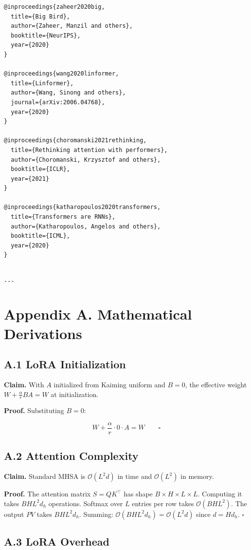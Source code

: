 \begin{lstlisting}
@inproceedings{zaheer2020big,
  title={Big Bird},
  author={Zaheer, Manzil and others},
  booktitle={NeurIPS},
  year={2020}
}

@inproceedings{wang2020linformer,
  title={Linformer},
  author={Wang, Sinong and others},
  journal={arXiv:2006.04768},
  year={2020}
}

@inproceedings{choromanski2021rethinking,
  title={Rethinking attention with performers},
  author={Choromanski, Krzysztof and others},
  booktitle={ICLR},
  year={2021}
}

@inproceedings{katharopoulos2020transformers,
  title={Transformers are RNNs},
  author={Katharopoulos, Angelos and others},
  booktitle={ICML},
  year={2020}
}
\end{lstlisting}
\begin{lstlisting}

---
\end{lstlisting}


\section{Appendix A. Mathematical Derivations}

\subsection{A.1 LoRA Initialization}

\textbf{Claim.} With $A$ initialized from Kaiming uniform and $B = 0$, the 
effective weight $W + \frac{\alpha}{r} B A = W$ at initialization.

\textbf{Proof.} Substituting $B = 0$:

\[
W + \frac{\alpha}{r} \cdot 0 \cdot A = W \qquad \square
\]

\subsection{A.2 Attention Complexity}

\textbf{Claim.} Standard MHSA is $\mathcal{O}(L^2 d)$ in time and $\mathcal{O}(L^2)$ 
in memory.

\textbf{Proof.} The attention matrix $S = Q K^\top$ has shape $B \times H \times L \times L$. 
Computing it takes $B H L^2 d_h$ operations. Softmax over $L$ entries per 
row takes $\mathcal{O}(B H L^2)$. The output $P V$ takes $B H L^2 d_h$. 
Summing: $\mathcal{O}(B H L^2 d_h) = \mathcal{O}(L^2 d)$ since $d = H d_h$. $\square$

\subsection{A.3 LoRA Overhead}

